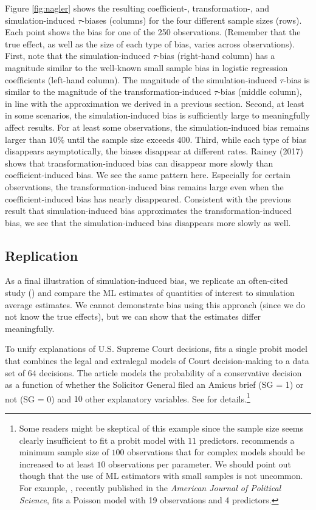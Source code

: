 \documentclass[11pt]{article}
\begin{document}
Figure \ref{fig:nagler} shows the resulting coefficient-, transformation-, and simulation-induced $\tau$-biases (columns) for the four different sample sizes (rows). Each point shows the bias for one of the 250 observations. (Remember that the true effect, as well as the size of each type of bias, varies across observations). First, note that the simulation-induced $\tau$-bias (right-hand column) has a magnitude similar to the well-known small sample bias in logistic regression coefficients (left-hand column). The magnitude of the simulation-induced $\tau$-bias is similar to the magnitude of the transformation-induced $\tau$-bias (middle column), in line with the approximation we derived in a previous section. Second, at least in some scenarios, the simulation-induced bias is sufficiently large to meaningfully affect results. For at least some observations, the simulation-induced bias remains larger than $10\%$ until the sample size exceeds $400$. Third, while each type of bias disappears asymptotically, the biases disappear at different rates. Rainey (2017) shows that transformation-induced bias can disappear more slowly than coefficient-induced bias. We see the same pattern here. Especially for certain observations, the transformation-induced bias remains large even when the coefficient-induced bias has nearly disappeared. Consistent with the previous result that simulation-induced bias approximates the transformation-induced bias, we see that the simulation-induced bias disappears more slowly as well.


\subsection*{Replication}

As a final illustration of simulation-induced bias, we replicate an often-cited study (\citealt{GeorgeEpstein1992}) and compare the ML estimates of quantities of interest to simulation average estimates. We cannot demonstrate bias using this approach (since we do not know the true effects), but we can show that the estimates differ meaningfully.


To unify explanations of U.S. Supreme Court decisions, \cite{GeorgeEpstein1992} fits a single probit model that combines the legal and extralegal models of Court decision-making to a data set of $64$ decisions. The article models the probability of a conservative decision as a function of whether the Solicitor General filed an Amicus brief (SG = 1) or not (SG = 0) and $10$ other explanatory variables. See \cite{GeorgeEpstein1992} for details.\footnote{Some readers might be skeptical of this example since the sample size seems clearly insufficient to fit a probit model with $11$ predictors. \citet[3.5.1]{Long1997} recommends a minimum sample size of $100$ observations that for complex models should be increased to at least $10$ observations per parameter. We should point out though that the use of ML estimators with small samples is not uncommon. For example, \cite{Holland2015}, recently published in the \emph{American Journal of Political Science}, fits a Poisson model with 19 observations and 4 predictors.}
\end{document}
